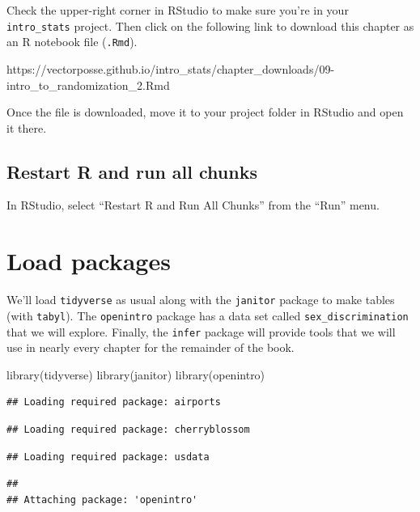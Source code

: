 \documentclass[
]{book}
\newenvironment{Shaded}{\begin{snugshade}}{\end{snugshade}}
\newcommand{\FunctionTok}[1]{\textcolor[rgb]{0.00,0.00,0.00}{#1}}
\newcommand{\NormalTok}[1]{#1}
\begin{document}
Check the upper-right corner in RStudio to make sure you're in your \texttt{intro\_stats} project. Then click on the following link to download this chapter as an R notebook file (\texttt{.Rmd}).

https://vectorposse.github.io/intro\_stats/chapter\_downloads/09-intro\_to\_randomization\_2.Rmd

Once the file is downloaded, move it to your project folder in RStudio and open it there.

\hypertarget{randomization2-restart}{%
\subsection{Restart R and run all chunks}\label{randomization2-restart}}

In RStudio, select ``Restart R and Run All Chunks'' from the ``Run'' menu.

\hypertarget{randomization2-load}{%
\section{Load packages}\label{randomization2-load}}

We'll load \texttt{tidyverse} as usual along with the \texttt{janitor} package to make tables (with \texttt{tabyl}). The \texttt{openintro} package has a data set called \texttt{sex\_discrimination} that we will explore. Finally, the \texttt{infer} package will provide tools that we will use in nearly every chapter for the remainder of the book.

\begin{Shaded}
\begin{Highlighting}[]
\FunctionTok{library}\NormalTok{(tidyverse)}
\FunctionTok{library}\NormalTok{(janitor)}
\FunctionTok{library}\NormalTok{(openintro)}
\end{Highlighting}
\end{Shaded}

\begin{verbatim}
## Loading required package: airports
\end{verbatim}

\begin{verbatim}
## Loading required package: cherryblossom
\end{verbatim}

\begin{verbatim}
## Loading required package: usdata
\end{verbatim}

\begin{verbatim}
## 
## Attaching package: 'openintro'
\end{verbatim}
\end{document}
